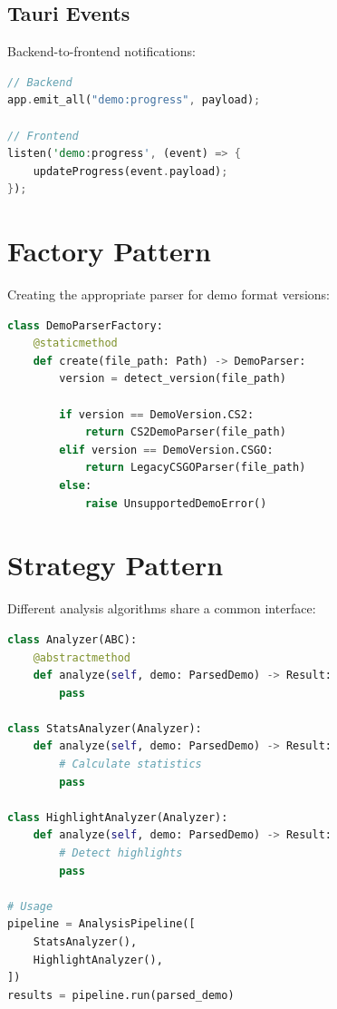 \subsection{Tauri Events}

Backend-to-frontend notifications:

\begin{lstlisting}[language=Rust]
// Backend
app.emit_all("demo:progress", payload);

// Frontend
listen('demo:progress', (event) => {
    updateProgress(event.payload);
});
\end{lstlisting}

\section{Factory Pattern}


Creating the appropriate parser for demo format versions:

\begin{lstlisting}[language=Python]
class DemoParserFactory:
    @staticmethod
    def create(file_path: Path) -> DemoParser:
        version = detect_version(file_path)
        
        if version == DemoVersion.CS2:
            return CS2DemoParser(file_path)
        elif version == DemoVersion.CSGO:
            return LegacyCSGOParser(file_path)
        else:
            raise UnsupportedDemoError()
\end{lstlisting}

\section{Strategy Pattern}

Different analysis algorithms share a common interface:

\begin{lstlisting}[language=Python]
class Analyzer(ABC):
    @abstractmethod
    def analyze(self, demo: ParsedDemo) -> Result:
        pass

class StatsAnalyzer(Analyzer):
    def analyze(self, demo: ParsedDemo) -> Result:
        # Calculate statistics
        pass

class HighlightAnalyzer(Analyzer):
    def analyze(self, demo: ParsedDemo) -> Result:
        # Detect highlights
        pass

# Usage
pipeline = AnalysisPipeline([
    StatsAnalyzer(),
    HighlightAnalyzer(),
])
results = pipeline.run(parsed_demo)
\end{lstlisting}

